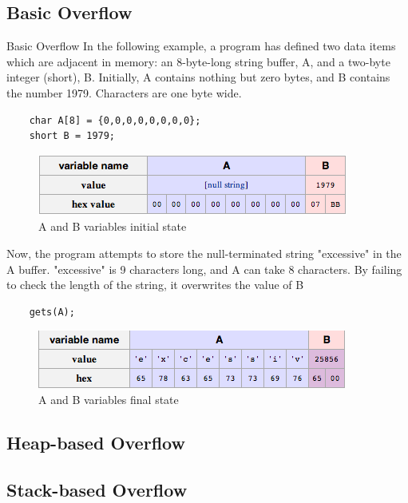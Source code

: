 \subsection{Basic Overflow}
\begin{frame}{Basic Overflow}
	In the following example, a program has defined two data items which are adjacent in memory: an 8-byte-long string buffer, A, and a two-byte integer (short), B. Initially, A contains nothing but zero bytes, and B contains the number 1979. Characters are one byte wide.
	\ccode
	\begin{lstlisting}
	char A[8] = {0,0,0,0,0,0,0,0};
	short B = 1979;
	\end{lstlisting}
	\begin{figure}
		\centering
		\includegraphics[width=\textwidth]{imgs/initialAB.png}
		\caption{A and B variables initial state}
		\label{fig:initialAB}
	\end{figure}
\framebreak
	Now, the program attempts to store the null-terminated string "excessive" in the A buffer. "excessive" is 9 characters long, and A can take 8 characters. By failing to check the length of the string, it overwrites the value of B
	\ccode
	\begin{lstlisting}
	gets(A);
	\end{lstlisting}
	\begin{figure}
		\centering
		\includegraphics[width=\textwidth]{imgs/finalAB.png}
		\caption{A and B variables final state}
		\label{fig:finalAB}
	\end{figure}
\end{frame}

\subsection{Heap-based Overflow}
\subsection{Stack-based Overflow}
